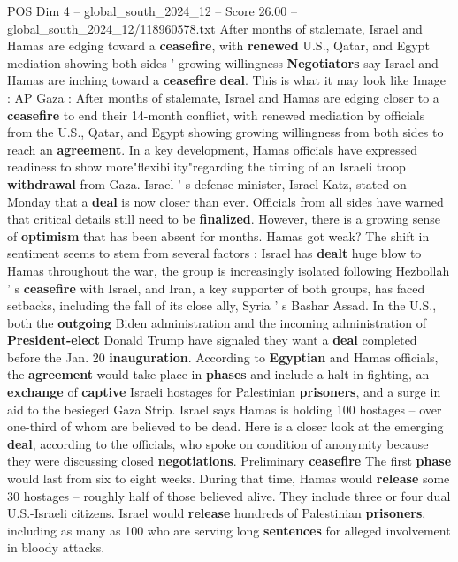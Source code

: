 \begin{textsample}{POS Dim 4 – global\_south\_2024\_12 – Score 26.00 – global\_south\_2024\_12/118960578.txt}  \label{ex:f4_pos_251}
After months of stalemate, Israel and Hamas are edging toward a \textbf{ceasefire}, with \textbf{renewed} U.S., Qatar, and Egypt mediation showing both sides ' growing willingness \textbf{Negotiators} say Israel and Hamas are inching toward a \textbf{ceasefire} \textbf{deal}.
This is what it may look like Image : AP Gaza : After months of stalemate, Israel and Hamas are edging closer to a \textbf{ceasefire} to end their 14-month conflict, with renewed mediation by officials from the U.S., Qatar, and Egypt showing growing willingness from both sides to reach an \textbf{agreement}.
In a key development, Hamas officials have expressed readiness to show more"flexibility"regarding the timing of an Israeli troop \textbf{withdrawal} from Gaza.
Israel ' s defense minister, Israel Katz, stated on Monday that a \textbf{deal} is now closer than ever.
Officials from all sides have warned that critical details still need to be \textbf{finalized}.
However, there is a growing sense of \textbf{optimism} that has been absent for months.
Hamas got weak?
The shift in sentiment seems to stem from several factors : Israel has \textbf{dealt} huge blow to Hamas throughout the war, the group is increasingly isolated following Hezbollah ' s \textbf{ceasefire} with Israel, and Iran, a key supporter of both groups, has faced setbacks, including the fall of its close ally, Syria ' s Bashar Assad.
In the U.S., both the \textbf{outgoing} Biden administration and the incoming administration of \textbf{President-elect} Donald Trump have signaled they want a \textbf{deal} completed before the Jan. 20 \textbf{inauguration}.
According to \textbf{Egyptian} and Hamas officials, the \textbf{agreement} would take place in \textbf{phases} and include a halt in fighting, an \textbf{exchange} of \textbf{captive} Israeli hostages for Palestinian \textbf{prisoners}, and a surge in aid to the besieged Gaza Strip.
Israel says Hamas is holding 100 hostages -- over one-third of whom are believed to be dead.
Here is a closer look at the emerging \textbf{deal}, according to the officials, who spoke on condition of anonymity because they were discussing closed \textbf{negotiations}.
Preliminary \textbf{ceasefire} The first \textbf{phase} would last from six to eight weeks.
During that time, Hamas would \textbf{release} some 30 hostages -- roughly half of those believed alive.
They include three or four dual U.S.-Israeli citizens.
Israel would \textbf{release} hundreds of Palestinian \textbf{prisoners}, including as many as 100 who are serving long \textbf{sentences} for alleged involvement in bloody attacks.

\end{textsample}
